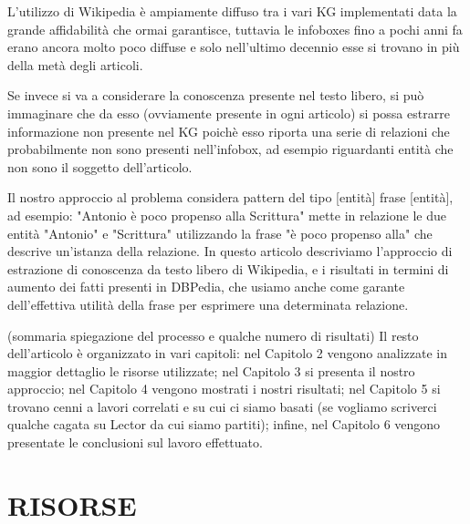 \documentclass[10pt,a4paper,twocolumn]{article}
\begin{document}
L'utilizzo di Wikipedia è ampiamente diffuso tra i vari KG implementati data la grande affidabilità che ormai garantisce, tuttavia le infoboxes fino a pochi anni fa erano ancora molto poco diffuse e solo nell'ultimo decennio esse si trovano in più della metà degli articoli.

Se invece si va a considerare la conoscenza presente nel testo libero, si può immaginare che da esso (ovviamente presente in ogni articolo) si possa estrarre informazione non presente nel KG poichè esso riporta una serie di relazioni che probabilmente non sono presenti nell'infobox, ad esempio riguardanti entità che non sono il soggetto dell'articolo.

Il nostro approccio al problema considera pattern del tipo [entità] frase [entità], ad esempio: "Antonio è poco propenso alla Scrittura" mette in relazione le due entità "Antonio" e "Scrittura" utilizzando la frase "è poco propenso alla" che descrive un'istanza della relazione.
In questo articolo descriviamo l'approccio di estrazione di conoscenza da testo libero di Wikipedia, e i risultati in termini di aumento dei fatti presenti in DBPedia, che usiamo anche come garante dell'effettiva utilità della frase per esprimere una determinata relazione.

(sommaria spiegazione del processo e qualche numero di risultati)
Il resto dell'articolo è organizzato in vari capitoli: nel Capitolo 2 vengono analizzate in maggior dettaglio le risorse utilizzate; nel Capitolo 3 si presenta il nostro approccio; nel Capitolo 4 vengono mostrati i nostri risultati; nel Capitolo 5 si trovano cenni a lavori correlati e su cui ci siamo basati (se vogliamo scriverci qualche cagata su Lector da cui siamo partiti); infine, nel Capitolo 6 vengono presentate le conclusioni sul lavoro effettuato.

\section{RISORSE}
\end{document}
